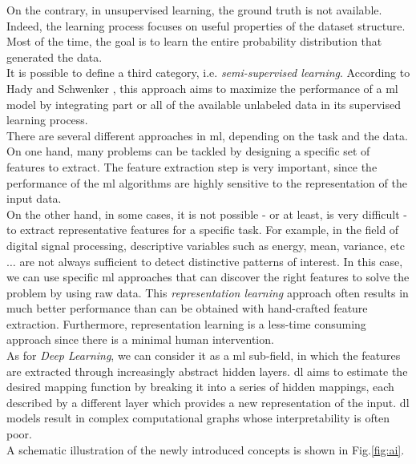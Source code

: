 On the contrary, in unsupervised learning, the ground truth is not available. Indeed, the learning process focuses on useful properties of the dataset structure. Most of the time, the goal is to learn the entire probability distribution that generated the data. \\
It is possible to define a third category, i.e. \textit{semi-supervised learning}. According to Hady and Schwenker \cite{hady2013semi}, this approach aims to maximize the performance of a \gls{ml} model by integrating part or all of the available unlabeled data in its supervised learning process. \\
There are several different approaches in \gls{ml}, depending on the task and the data. On one hand, many problems can be tackled by designing a specific set of features to extract. The feature extraction step is very important, since the performance of the \gls{ml} algorithms are highly sensitive to the representation of the input data. \\
On the other hand, in some cases, it is not possible - or at least, is very difficult - to extract representative features for a specific task. For example, in the field of digital signal processing, descriptive variables such as energy, mean, variance, etc$\dots$ are not always sufficient to detect distinctive patterns of interest. In this case, we can use specific \gls{ml} approaches that can discover the right features to solve the problem by using raw data. This \textit{representation learning} approach often results in much better performance than can be obtained with hand-crafted feature extraction. Furthermore, representation learning is a less-time consuming approach since there is a minimal human intervention. \\
As for \textit{Deep Learning}, we can consider it as a \gls{ml} sub-field, in which the features are extracted through increasingly abstract hidden layers. \gls{dl} aims to estimate the desired mapping function by breaking it into a series of hidden mappings, each described by a different layer which provides a new representation of the input. \gls{dl} models result in complex computational graphs whose interpretability is often poor. \\
A schematic illustration of the newly introduced concepts is shown in Fig.\ref{fig:ai}.

